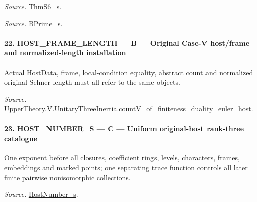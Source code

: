 \documentclass[11pt,a4paper]{article}
\numberwithin{equation}{section}
\theoremstyle{remark}\newtheorem{remark}[theorem]{Remark}
\begin{document}
\emph{Source.} \href{https://github.com/CocoSgt/riemann-hypothesis-lean/blob/7cbf7a0c32fca1badf05931879a37c3f8a2b03b4/src/Development/AutomorphicArithmetic/AutomorphicVarieties/ModularityArgument/ThresholdArguments/DenseThresholdCases/ThmS6CoreS.lean#L17-L26}{ThmS6\_\allowbreak s}.

\emph{Source.} \href{https://github.com/CocoSgt/riemann-hypothesis-lean/blob/7cbf7a0c32fca1badf05931879a37c3f8a2b03b4/src/Development/AutomorphicArithmetic/AutomorphicVarieties/ModularityArgument/ThresholdArguments/DenseThresholdCases/ThmS6CoreS.lean#L12-L16}{BPrime\_\allowbreak s}.



\paragraph{22. HOST\_\allowbreak FRAME\_\allowbreak LENGTH — B — Original Case-V host/frame and normalized-length installation}

Actual HostData, frame, local-condition equality, abstract count and normalized original Selmer length must all refer to the same objects.

\emph{Source.} \href{https://github.com/CocoSgt/riemann-hypothesis-lean/blob/7cbf7a0c32fca1badf05931879a37c3f8a2b03b4/src/Development/AutomorphicArithmetic/AutomorphicVarieties/ModularityArgument/ThresholdArguments/DenseThresholdCases/CountVOf.lean#L33-L60}{UpperTheory.V.UnitaryThreeInertia.countV\_\allowbreak of\_\allowbreak finiteness\_\allowbreak duality\_\allowbreak euler\_\allowbreak host}.



\paragraph{23. HOST\_\allowbreak NUMBER\_\allowbreak S — C — Uniform original-host rank-three catalogue}

One exponent before all closures, coefficient rings, levels, characters, frames, embeddings and marked points; one separating trace function controls all later finite pairwise nonisomorphic collections.

\emph{Source.} \href{https://github.com/CocoSgt/riemann-hypothesis-lean/blob/7cbf7a0c32fca1badf05931879a37c3f8a2b03b4/src/Development/AutomorphicArithmetic/AutomorphicVarieties/ModularityArgument/ThresholdArguments/DenseThresholdCases/HostNumberS.lean#L18-L28}{HostNumber\_\allowbreak s}.
\end{document}
